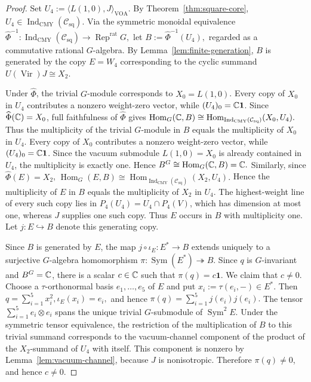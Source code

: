 \documentclass[10pt,a4paper]{amsart}
\numberwithin{equation}{section} \newtheorem{thm}{Theorem}[section] \newtheorem{lem}[thm]{Lemma} \newtheorem{ex}[thm]{Example} \newtheorem{prop}[thm]{Proposition} \newtheorem{cor}[thm]{Corollary} \newtheorem{defi}[thm]{Definition} \newtheorem{rmk}[thm]{Remark} \newtheorem{notation}[thm]{Notation}
\newcommand{\one}{\mathbf{1}}
\newcommand{\Vir}{\operatorname{Vir}}
\newcommand{\Rep}{\operatorname{Rep}}
\newcommand{\Sym}{\operatorname{Sym}}
\newcommand{\Hom}{\operatorname{Hom}}
\newcommand{\Csq}{\mathcal C_{\mathrm{sq}}}
\newcommand{\IndCMY}{\operatorname{Ind}_{\mathrm{CMY}}}
\begin{document}
\begin{proof}
Set \(U_4:=\langle L(1,0),J\rangle_{\mathrm{VOA}}.\) By Theorem~\ref{thm:square-core}, $U_4\in\IndCMY(\Csq)$. Via the symmetric monoidal equivalence \(\widehat\Phi^{-1}:\IndCMY(\Csq)\to\Rep^{\mathrm{rat}}G,\) let \(B:=\widehat\Phi^{-1}(U_4),\) regarded as a commutative rational $G$-algebra. By Lemma~\ref{lem:finite-generation}, $B$ is generated by the copy $E=W_4$ corresponding to the cyclic summand $U(\Vir)J\cong X_2$.

Under $\widehat\Phi$, the trivial $G$-module corresponds to $X_0=L(1,0)$. Every copy of $X_0$ in $U_4$ contributes a nonzero weight-zero vector, while $(U_4)_0=\C\one$. Since $\widehat\Phi(\mathbb{C})=X_0$, full faithfulness of $\widehat\Phi$ gives \(\Hom_G(\C,B)\cong\Hom_{\IndCMY(\Csq)}(X_0,U_4).\) Thus the multiplicity of the trivial $G$-module in $B$ equals the multiplicity of $X_0$ in $U_4$. Every copy of $X_0$ contributes a nonzero weight-zero vector, while $(U_4)_0=\C\one$. Since the vacuum submodule $L(1,0)=X_0$ is already contained in $U_4$, the multiplicity is exactly one. Hence \(B^G\cong\Hom_G(\C,B)=\C.\) Similarly, since $\widehat\Phi(E)=X_2$, \(\Hom_G(E,B)\cong\Hom_{\IndCMY(\Csq)}(X_2,U_4).\) Hence the multiplicity of $E$ in $B$ equals the multiplicity of $X_2$ in $U_4$. The highest-weight line of every such copy lies in \(P_4(U_4)=U_4\cap P_4(V)\), which has dimension at most one, whereas $J$ supplies one such copy. Thus $E$ occurs in $B$ with multiplicity one. Let \(j:E\hookrightarrow B\) denote this generating copy.

Since $B$ is generated by $E$, the map \(j\circ\iota_E:E^*\longrightarrow B\) extends uniquely to a surjective $G$-algebra homomorphism \(\pi:\Sym(E^*)\twoheadrightarrow B.\) Since $q$ is $G$-invariant and $B^G=\mathbb{C}$, there is a scalar $c\in\mathbb{C}$ such that $\pi(q)=c\one$. We claim that $c\ne0$. Choose a $\tau$-orthonormal basis $e_1,\ldots,e_5$ of $E$ and put $x_i:=\tau(e_i,-)\in E^*$. Then \(q=\sum_{i=1}^5 x_i^2,\iota_E(x_i)=e_i,\) and hence \(\pi(q)=\sum_{i=1}^5 j(e_i)j(e_i).\) The tensor \(\sum_{i=1}^5 e_i\otimes e_i\) spans the unique trivial $G$-submodule of $\Sym^2E$. Under the symmetric tensor equivalence, the restriction of the multiplication of $B$ to this trivial summand corresponds to the vacuum-channel component of the product of the $X_2$-summand of $U_4$ with itself. This component is nonzero by Lemma~\ref{lem:vacuum-channel}, because $J$ is nonisotropic. Therefore \(\pi(q)\ne0\), and hence $c\ne0$.


\end{proof}
\end{document}
